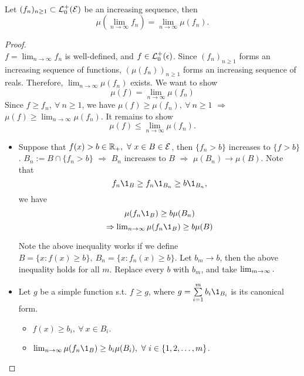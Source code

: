 \begin{theorem}\label{MCT}\ \\
Let $(f_n)_{n \geq 1} \subset \mathcal{L}_0^+(\mathcal{E})$ be an increasing sequence, then
\begin{equation*}
    \mu(\lim_{n \to \infty} f_n) = \lim_{n \to \infty} \mu(f_n).
\end{equation*}
\end{theorem}
\begin{proof}\ \\
$f = \lim_{n \to \infty} f_n$ is well-defined, and $f \in \mathcal{L}_0^+(\epsilon)$. Since $(f_n)_{n \geq 1}$ forms an increasing sequence of functions, $(\mu(f_n))_{n\geq 1}$ forms an increasing sequence of reals. Therefore, $\lim_{n \to \infty} \mu(f_n)$ exists. We want to show 
\begin{equation*}
    \mu(f) = \lim_{n \to \infty} \mu(f_n)
\end{equation*}
Since $f \geq f_n,\ \forall\ n \geq 1$, we have $\mu(f) \geq \mu(f_n),\ \forall\ n \geq 1$ $\Rightarrow$ $\mu(f) \geq \lim_{n \to \infty} \mu(f_n)$. It remains to show
$$\mu(f) \leq \lim_{n \to \infty} \mu(f_n).$$
\begin{itemize}
    \item Suppose that $f(x) > b \in \R_+,\ \forall\ x \in B \in \Es$, then $\{f_n > b\}$ increases to $\{f > b\}$. $B_n := B \cap \{f_n > b\}$ $\Rightarrow$ $B_n$ increases to $B$ $\Rightarrow$ $\mu(B_n) \to \mu(B)$. Note that 
    $$f_n \1_B \geq f_n \1_{B_n} \geq b \1_{B_n},$$
    we have 
    \begin{equation*}
        \mu(f_n \1_B) \geq b \mu(B_n)
    \end{equation*} 
    \begin{equation*}
        \Rightarrow \limm{n}{\infty} \mu(f_n \1_B) \geq b \mu(B)
    \end{equation*}
    \begin{remark}
     Note the above inequality works if we define $B = \{x: f(x) \geq b\},\ B_n = \{x: f_n(x) \geq b\}$. Let $b_m \to b$, then the above inequality holds for all $m$. Replace every $b$ with $b_m$, and take    $\textstyle\lim_{m \to \infty}.$
    \end{remark}
    \item Let $g$ be a simple function s.t. $f \geq g$, where $g = \summ{i=1}{m} b_i \1_{B_i}$ is its canonical form. 
    \begin{itemize}
        \item $f(x) \geq b_i,\ \forall\ x \in B_i$.
        \item $\limm{n}{\infty} \mu(f_n \1_B) \geq b_i \mu(B_i),\ \forall\ i \in \{1,2,\dots, m\}$.

\end{itemize}
\end{itemize}
\end{proof}

